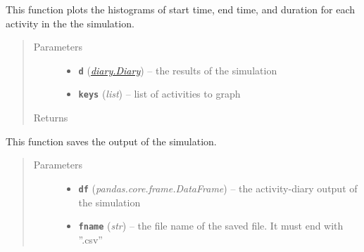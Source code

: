\documentclass[letterpaper,10pt,english]{sphinxmanual}
\begin{document}

\begin{fulllineitems}
\label{main:main.plot_histograms}
This function plots the histograms of start time, end time, and duration for each activity in     the the simulation.
\begin{quote}\begin{description}
\item[{Parameters}] \leavevmode\begin{itemize}
\item {} 
\textbf{\texttt{d}} ({\hyperref[diary:diary.Diary]{\emph{\emph{diary.Diary}}}}) -- the results of the simulation

\item {} 
\textbf{\texttt{keys}} (\emph{list}) -- list of activities to graph

\end{itemize}

\item[{Returns}] \leavevmode


\end{description}\end{quote}

\end{fulllineitems}


\begin{fulllineitems}
\label{main:main.save_output}
This function saves the output of the simulation.
\begin{quote}\begin{description}
\item[{Parameters}] \leavevmode\begin{itemize}
\item {} 
\textbf{\texttt{df}} (\emph{pandas.core.frame.DataFrame}) -- the activity-diary output of the simulation

\item {} 
\textbf{\texttt{fname}} (\emph{str}) -- the file name of the saved file. It must end with ''.csv''

\end{itemize}

\end{description}\end{quote}

\end{fulllineitems}
\end{document}
